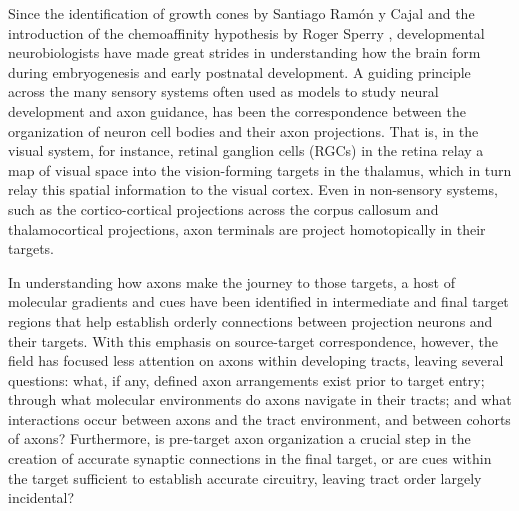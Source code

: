 Since the identification of growth cones by Santiago Ram\'on y Cajal and the introduction of the chemoaffinity hypothesis by Roger Sperry \cite{sperry1963chemoaffinity}, developmental neurobiologists have made great strides in understanding how the brain form during embryogenesis and early postnatal development.
A guiding principle across the many sensory systems often used as models to study neural development and axon guidance, has been the correspondence between the organization of neuron cell bodies and their axon projections.
That is, in the visual system, for instance, retinal ganglion cells (RGCs) in the retina relay a map of visual space into the vision-forming targets in the thalamus, which in turn relay this spatial information to the visual cortex.
Even in non-sensory systems, such as the cortico-cortical projections across the corpus callosum and thalamocortical projections, axon terminals are project homotopically in their targets. %

In understanding how axons make the journey to those targets, a host of molecular gradients and cues have been identified in intermediate and final target regions that help establish orderly connections between projection neurons and their targets.
With this emphasis on source-target correspondence, however, the field has focused less attention on axons within developing tracts, leaving several questions: what, if any, defined axon arrangements exist prior to target entry; through what molecular environments do axons navigate in their tracts; and what interactions occur between axons and the tract environment, and between cohorts of axons?
Furthermore, is pre-target axon organization a crucial step in the creation of accurate synaptic connections in the final target, or are cues within the target sufficient to establish accurate circuitry, leaving tract order largely incidental?


